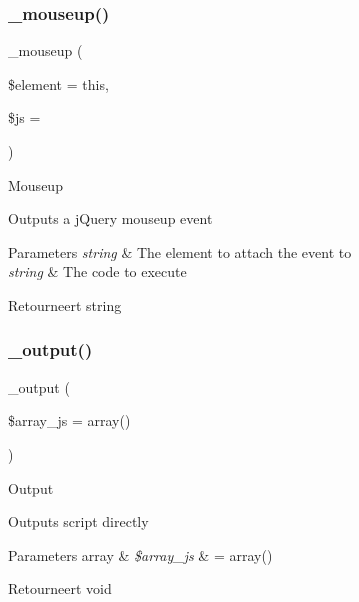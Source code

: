 \subsubsection{\texorpdfstring{\_mouseup()}{\_mouseup()}}
{\footnotesize\ttfamily \+\_\+mouseup (\begin{DoxyParamCaption}\item[{}]{\$element = {\ttfamily \textquotesingle{}this\textquotesingle{}},  }\item[{}]{\$js = {\ttfamily \textquotesingle{}\textquotesingle{}} }\end{DoxyParamCaption})\hspace{0.3cm}{\ttfamily [protected]}}

Mouseup

Outputs a j\+Query mouseup event


\begin{DoxyParams}{Parameters}
{\em string} & The element to attach the event to \\
\hline
{\em string} & The code to execute \\
\hline
\end{DoxyParams}
\begin{DoxyReturn}{Retourneert}
string 
\end{DoxyReturn}
\mbox{\label{class_c_i___jquery_a6a837913fb7adb3e611aa97a89d56a6e}} 
\subsubsection{\texorpdfstring{\_output()}{\_output()}}
{\footnotesize\ttfamily \+\_\+output (\begin{DoxyParamCaption}\item[{}]{\$array\+\_\+js = {\ttfamily array()} }\end{DoxyParamCaption})\hspace{0.3cm}{\ttfamily [protected]}}

Output

Outputs script directly


\begin{DoxyParams}[1]{Parameters}
array & {\em \$array\+\_\+js} & = array() \\
\hline
\end{DoxyParams}
\begin{DoxyReturn}{Retourneert}
void 
\end{DoxyReturn}
\mbox{\label{class_c_i___jquery_a6dd4fcc0640975784e69d1ea11eba291}} 

